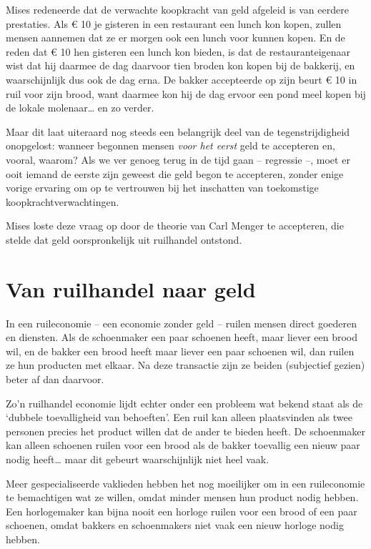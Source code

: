 \documentclass[
  a5paper,
  smalldemyvopaper,11pt,twoside,onecolumn,openright,extrafontsizes]{memoir}
\begin{document}
Mises redeneerde dat de verwachte koopkracht van geld afgeleid is van
eerdere prestaties. Als € 10 je gisteren in een restaurant een lunch kon
kopen, zullen mensen aannemen dat ze er morgen ook een lunch voor kunnen
kopen. En de reden dat € 10 hen gisteren een lunch kon bieden, is dat de
restauranteigenaar wist dat hij daarmee de dag daarvoor tien broden kon
kopen bij de bakkerij, en waarschijnlijk dus ook de dag erna. De bakker
accepteerde op zijn beurt € 10 in ruil voor zijn brood, want daarmee kon
hij de dag ervoor een pond meel kopen bij de lokale molenaar\ldots{} en
zo verder.

Maar dit laat uiteraard nog steeds een belangrijk deel van de
tegenstrijdigheid onopgelost: wanneer begonnen mensen \emph{voor het
eerst} geld te accepteren en, vooral, waarom? Als we ver genoeg terug in
de tijd gaan -- regressie --, moet er ooit iemand de eerste zijn geweest
die geld begon te accepteren, zonder enige vorige ervaring om op te
vertrouwen bij het inschatten van toekomstige koopkrachtverwachtingen.

Mises loste deze vraag op door de theorie van Carl Menger te accepteren,
die stelde dat geld oorspronkelijk uit ruilhandel ontstond.

\section{Van ruilhandel naar geld}\label{van-ruilhandel-naar-geld}

In een ruileconomie -- een economie zonder geld -- ruilen mensen direct
goederen en diensten. Als de schoenmaker een paar schoenen heeft, maar
liever een brood wil, en de bakker een brood heeft maar liever een paar
schoenen wil, dan ruilen ze hun producten met elkaar. Na deze transactie
zijn ze beiden (subjectief gezien) beter af dan daarvoor.

Zo'n ruilhandel economie lijdt echter onder een probleem wat bekend
staat als de `dubbele toevalligheid van behoeften'. Een ruil kan alleen
plaatsvinden als twee personen precies het product willen dat de ander
te bieden heeft. De schoenmaker kan alleen schoenen ruilen voor een
brood als de bakker toevallig een nieuw paar nodig heeft\ldots{} maar
dit gebeurt waarschijnlijk niet heel vaak.

Meer gespecialiseerde vaklieden hebben het nog moeilijker om in een
ruileconomie te bemachtigen wat ze willen, omdat minder mensen hun
product nodig hebben. Een horlogemaker kan bijna nooit een horloge
ruilen voor een brood of een paar schoenen, omdat bakkers en
schoenmakers niet vaak een nieuw horloge nodig hebben.
\end{document}
